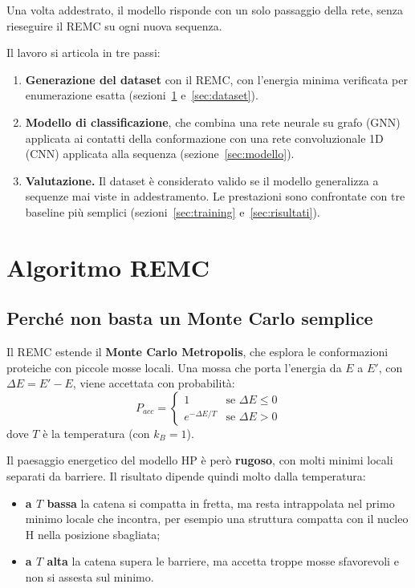 \documentclass[11pt,a4paper]{article}
\begin{document}
Una volta addestrato, il modello risponde con un solo passaggio della rete, senza rieseguire il REMC su ogni nuova sequenza.

Il lavoro si articola in tre passi:
\begin{enumerate}
  \item \textbf{Generazione del dataset} con il REMC, con l'energia minima verificata per enumerazione esatta (sezioni~\ref{sec:remc} e~\ref{sec:dataset}).
  \item \textbf{Modello di classificazione}, che combina una rete neurale su grafo (GNN) applicata ai contatti della conformazione con una rete convoluzionale 1D (CNN) applicata alla sequenza (sezione~\ref{sec:modello}).
  \item \textbf{Valutazione.} Il dataset è considerato valido se il modello generalizza a sequenze mai viste in addestramento. Le prestazioni sono confrontate con tre baseline più semplici (sezioni~\ref{sec:training} e~\ref{sec:risultati}).
\end{enumerate}


\section{Algoritmo REMC}
\label{sec:remc}

\subsection{Perché non basta un Monte Carlo semplice}
\label{sec:mc}

Il REMC estende il \textbf{Monte Carlo Metropolis}, che esplora le conformazioni proteiche con piccole mosse locali. Una mossa che porta l'energia da $E$ a $E'$, con $\Delta E = E' - E$, viene accettata con probabilità:
\begin{equation}
  P_{acc} =
  \begin{cases}
    1 & \text{se } \Delta E \le 0 \\
    e^{-\Delta E / T} & \text{se } \Delta E > 0
  \end{cases}
  \label{eq:metropolis}
\end{equation}
dove $T$ è la temperatura (con $k_B = 1$).

Il paesaggio energetico del modello HP è però \textbf{rugoso}, con molti minimi locali separati da barriere. Il risultato dipende quindi molto dalla temperatura:
\begin{itemize}
  \item \textbf{a $T$ bassa} la catena si compatta in fretta, ma resta intrappolata nel primo minimo locale che incontra, per esempio una struttura compatta con il nucleo H nella posizione sbagliata;
  \item \textbf{a $T$ alta} la catena supera le barriere, ma accetta troppe mosse sfavorevoli e non si assesta sul minimo.
\end{itemize}
\end{document}
